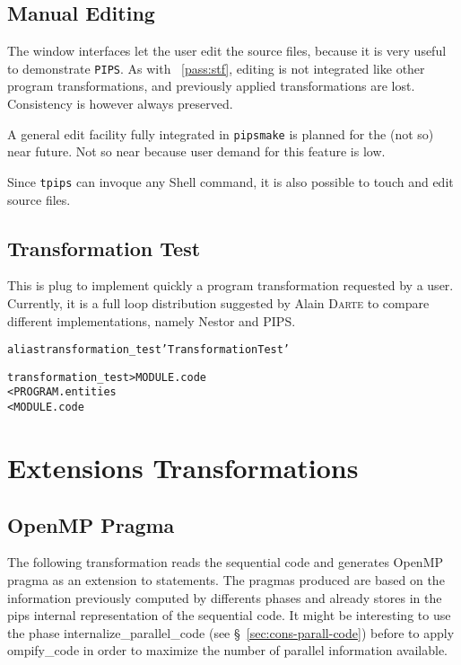 \documentclass[a4paper]{report}
\newenvironment{PipsMake}{\begin{alltt}}{\end{alltt}}
\newcommand{\PipsPassRef}[1]{\texttt{\detokenize{#1}}~\ref{pass:#1}}
\newenvironment{PipsPass}[1]{\label{pass:#1}}{}
\newcommand{\Pipsmake}{\texttt{pipsmake}}
\begin{document}
\subsection{Manual Editing}

The window interfaces let the user edit the source files, because it
is very useful to demonstrate {\tt PIPS}. As with
\PipsPassRef{stf}, editing is not integrated like other program
transformations, and previously applied transformations are lost.
Consistency is however always preserved.

A general edit facility fully integrated in \Pipsmake{} is planned
for the (not so) near future. Not so near because user demand for this
feature is low.

Since {\tt tpips} can invoque any Shell command, it is also possible
to touch and edit source files.



\subsection{Transformation Test}
\label{subsection-transformation_test}

\begin{PipsPass}{transformation_test}
  This is plug to implement quickly a program transformation requested
  by a user. Currently, it is a full loop distribution suggested by
  Alain \textsc{Darte} to compare different implementations, namely
  Nestor and PIPS.
\end{PipsPass}
\begin{PipsMake}
alias transformation_test 'Transformation Test'

transformation_test    > MODULE.code
        < PROGRAM.entities
        < MODULE.code
\end{PipsMake}


\section{Extensions Transformations}
\label{section-extensions_transformations}


\subsection{OpenMP Pragma}
\label{subsection-open_mp_pragma}

\begin{PipsPass}{ompify_code}
  The following transformation reads the sequential code and generates
  OpenMP pragma as an extension to statements. The pragmas produced
  are based on the information previously computed by differents
  phases and already stores in the pips internal representation of the
  sequential code. It might be interesting to use the phase
  internalize\_parallel\_code (see \S~\ref{sec:cons-parall-code})
  before to apply ompify\_code in order to maximize the number of
  parallel information available.
\end{PipsPass}
\end{document}
